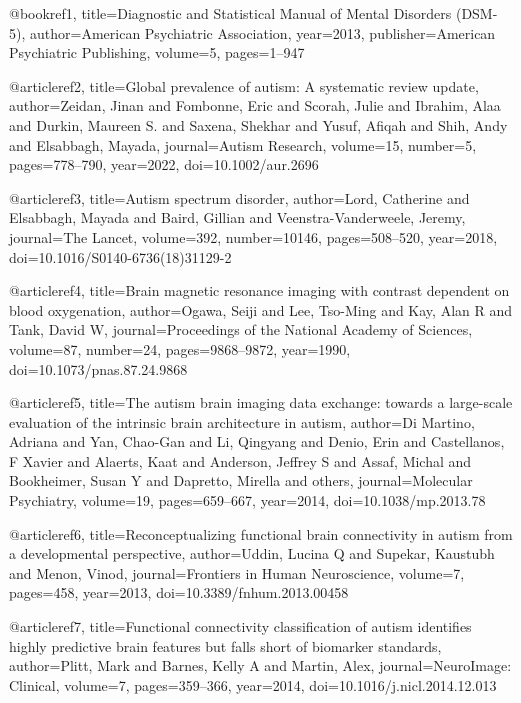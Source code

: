 @book{ref1,
  title={Diagnostic and Statistical Manual of Mental Disorders (DSM-5)},
  author={{American Psychiatric Association}},
  year={2013},
  publisher={American Psychiatric Publishing},
  volume={5},
  pages={1--947}
}

@article{ref2,
  title={Global prevalence of autism: A systematic review update},
  author={Zeidan, Jinan and Fombonne, Eric and Scorah, Julie and Ibrahim, Alaa and Durkin, Maureen S. and Saxena, Shekhar and Yusuf, Afiqah and Shih, Andy and Elsabbagh, Mayada},
  journal={Autism Research},
  volume={15},
  number={5},
  pages={778--790},
  year={2022},
  doi={10.1002/aur.2696}
}

@article{ref3,
  title={Autism spectrum disorder},
  author={Lord, Catherine and Elsabbagh, Mayada and Baird, Gillian and Veenstra-Vanderweele, Jeremy},
  journal={The Lancet},
  volume={392},
  number={10146},
  pages={508--520},
  year={2018},
  doi={10.1016/S0140-6736(18)31129-2}
}

@article{ref4,
  title={Brain magnetic resonance imaging with contrast dependent on blood oxygenation},
  author={Ogawa, Seiji and Lee, Tso-Ming and Kay, Alan R and Tank, David W},
  journal={Proceedings of the National Academy of Sciences},
  volume={87},
  number={24},
  pages={9868--9872},
  year={1990},
  doi={10.1073/pnas.87.24.9868}
}

@article{ref5,
  title={The autism brain imaging data exchange: towards a large-scale evaluation of the intrinsic brain architecture in autism},
  author={Di Martino, Adriana and Yan, Chao-Gan and Li, Qingyang and Denio, Erin and Castellanos, F Xavier and Alaerts, Kaat and Anderson, Jeffrey S and Assaf, Michal and Bookheimer, Susan Y and Dapretto, Mirella and others},
  journal={Molecular Psychiatry},
  volume={19},
  pages={659--667},
  year={2014},
  doi={10.1038/mp.2013.78}
}

@article{ref6,
  title={Reconceptualizing functional brain connectivity in autism from a developmental perspective},
  author={Uddin, Lucina Q and Supekar, Kaustubh and Menon, Vinod},
  journal={Frontiers in Human Neuroscience},
  volume={7},
  pages={458},
  year={2013},
  doi={10.3389/fnhum.2013.00458}
}

@article{ref7,
  title={Functional connectivity classification of autism identifies highly predictive brain features but falls short of biomarker standards},
  author={Plitt, Mark and Barnes, Kelly A and Martin, Alex},
  journal={NeuroImage: Clinical},
  volume={7},
  pages={359--366},
  year={2014},
  doi={10.1016/j.nicl.2014.12.013}
}


